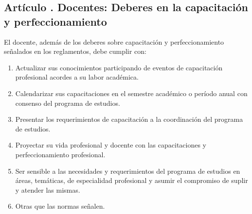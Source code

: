 \subsection{Artículo . Docentes: Deberes en la capacitación y perfeccionamiento}
\addtocounter{ns}{1}
El docente, además de los deberes sobre capacitación y perfeccionamiento señalados en los reglamentos, debe cumplir con: 
\begin{enumerate}
\item Actualizar sus conocimientos participando de eventos de capacitación profesional acordes a su labor académica. 
\item Calendarizar sus capacitaciones en el semestre académico o período anual con consenso del programa de estudios. 
\item Presentar los requerimientos de capacitación a la coordinación del programa de estudios. 
\item Proyectar su vida profesional y docente con las capacitaciones y perfeccionamiento profesional. 
\item Ser sensible a las necesidades y requerimientos del programa de estudios en áreas, temáticas, de especialidad profesional y asumir el compromiso de suplir y atender las mismas. 
\item Otras que las normas señalen.
\end{enumerate}
